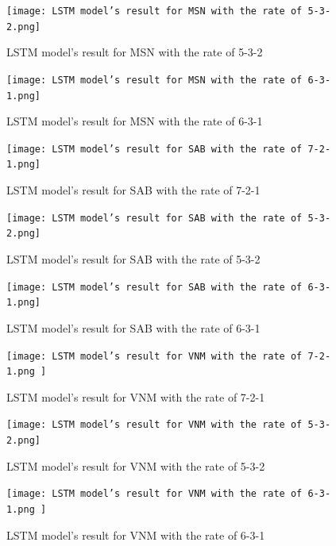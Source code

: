 \documentclass{ieeeojies}
\begin{document}
    \begin{figure}[H]

    \begin{minipage}{0.23\textwidth}
    \centering
    \texttt{[image: LSTM model’s result for MSN with the rate of 5-3-2.png]}
    \caption{LSTM model’s result for MSN with the rate of 5-3-2}
    \end{minipage}
    \hfill
    \begin{minipage}{0.23\textwidth}
    \centering
    \texttt{[image: LSTM model’s result for MSN with the rate of 6-3-1.png]}
    \caption{LSTM model’s result for MSN with the rate of 6-3-1}
    \end{minipage}
    \end{figure}
    \begin{figure}[H]
    \begin{minipage}{0.23\textwidth}
    \centering
    \texttt{[image: LSTM model’s result for SAB with the rate of 7-2-1.png]}
    \caption{LSTM model’s result for SAB with the rate of 7-2-1}
    \end{minipage}
    \hfill
    \begin{minipage}{0.23\textwidth}
    \centering
    \texttt{[image: LSTM model’s result for SAB with the rate of 5-3-2.png]}
    \caption{LSTM model’s result for SAB with the rate of 5-3-2}
    \end{minipage}
    \end{figure}
    
    \begin{figure}[H]
    \begin{minipage}{0.23\textwidth}
    \centering
    \texttt{[image: LSTM model’s result for SAB with the rate of 6-3-1.png]}
    \caption{LSTM model’s result for SAB with the rate of 6-3-1}
    \end{minipage}
    \hfill
    \begin{minipage}{0.23\textwidth}
    \centering
    \texttt{[image: LSTM model’s result for VNM with the rate of 7-2-1.png ]}
    \caption{LSTM model’s result for VNM with the rate of 7-2-1}
    \end{minipage}
    \end{figure}

    \begin{figure}[H]
    \begin{minipage}{0.23\textwidth}
    \centering
    \texttt{[image: LSTM model’s result for VNM with the rate of 5-3-2.png]}
    \caption{LSTM model’s result for VNM with the rate of 5-3-2}
    \end{minipage}
    \hfill
    \begin{minipage}{0.23\textwidth}
    \centering
    \texttt{[image: LSTM model’s result for VNM with the rate of 6-3-1.png ]}
    \caption{LSTM model’s result for VNM with the rate of 6-3-1}
    \end{minipage}
    \end{figure}
\end{document}
